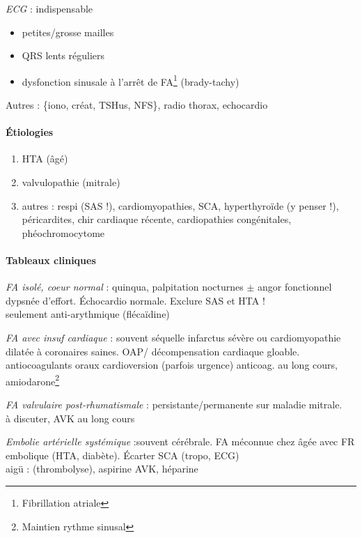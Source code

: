 \textit{ECG} : indispensable \danger
\begin{itemize}
  \item petites/grosse mailles
  \item QRS lents réguliers
  \item dysfonction sinusale à l'arrêt de FA\footnote{Fibrillation atriale}
    (brady-tachy)
\end{itemize}

Autres : \{iono, créat, TSHus, NFS\}, radio thorax, echocardio

\paragraph{Étiologies}
\begin{enumerate}
  \item HTA (âgé)
  \item valvulopathie (mitrale)
  \item autres : respi (SAS !), cardiomyopathies, SCA, hyperthyroïde (y penser
    !), péricardites, chir cardiaque récente, cardiopathies congénitales,
    phéochromocytome
\end{enumerate}

\paragraph{Tableaux cliniques}
\textit{FA isolé, coeur normal} : quinqua, palpitation nocturnes $\pm$ angor
fonctionnel \lor{} dypsnée d'effort. Échocardio normale. Exclure SAS et HTA !\\
\thus seulement anti-arythmique (flécaïdine)

\textit{FA avec insuf cardiaque} : souvent séquelle infarctus sévère ou
cardiomyopathie dilatée à coronaires saines. OAP/ décompensation cardiaque
gloable.\\
\thus antiocoagulants oraux \arrow{} cardioversion (parfois urgence) \arrow{}
anticoag. au long cours, amiodarone\footnote{Maintien rythme sinusal}

\textit{FA valvulaire post-rhumatismale}  : persistante/permanente sur maladie
mitrale. \\
\thus à discuter, AVK au long cours

\textit{Embolie artérielle systémique} :souvent cérébrale. FA méconnue chez
\female âgée avec FR embolique (HTA, diabète). Écarter SCA (tropo, ECG)\\
\thus aigü : (thrombolyse), aspirine \arrow{} AVK, héparine


